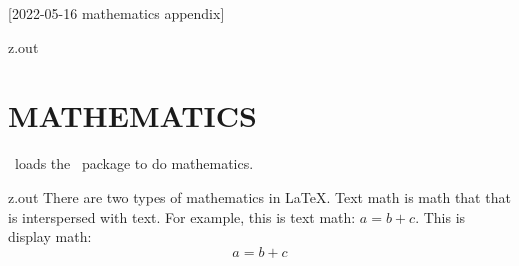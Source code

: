 [2022-05-16 mathematics appendix]

\begin{VerbatimOut}{z.out}
\chapter{MATHEMATICS}

\PurdueThesisLogo\ loads the \AMSmathLogo\ package
\cite{amslatex3project2019}
to do mathematics.
\end{VerbatimOut}

\MyIO


\begin{VerbatimOut}{z.out}
There are two types of mathematics in \LaTeX.
Text math is math that that is interspersed with text.
For example, this is text math: \(a = b + c\).
This is display math:
\begin{equation}
  a = b + c
\end{equation}
\end{VerbatimOut}

\MyIO



